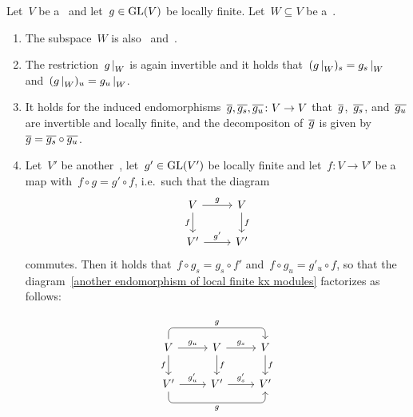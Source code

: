 \begin{lemma}
  \label{properties of local mjcd}
  Let~$V$ be a~ and let~$g \in \operatorname{GL}(V)$ be locally finite.
  Let~$W \subseteq V$ be a~.
  \begin{enumerate}
    \item
      The subspace~$W$ is also~ and~.
    \item
      \label{restriction of local mjcd}
      The restriction~$\restrict{g}{W}$ is again invertible and it holds that~$(\restrict{g}{W})_s = \restrict{g_s}{W}$ and~$(\restrict{g}{W})_u = \restrict{g_u}{W}$.
    \item
      \label{induced local mjcd}
      It holds for the induced endomorphisms~$\overline{g}, \overline{g_s}, \overline{g_u} \colon V \to V$ that~$\overline{g}$,~$\overline{g_s}$, and~$\overline{g_u}$ are invertible and locally finite, and the {\JCD} decompositon of~$\overline{g}$ is given by~$\overline{g} = \overline{g_s} \circ \overline{g_u}$.
    \item
      Let~$V'$ be another~, let~$g' \in \operatorname{GL}(V')$ be locally finite and let~$f \colon V \to V'$ be a~ map with~$f \circ g = g' \circ f$, i.e.\ such that the diagram
      \begin{equation}
        \label{another endomorphism of local finite kx modules}
        \begin{tikzcd}
            V
            \arrow{r}[above]{g}
            \arrow{d}[left]{f}
          & V
            \arrow{d}[right]{f}
          \\
            V'
            \arrow{r}[above]{g'}
          & V'
        \end{tikzcd}
      \end{equation}
      commutes.
      Then it holds that~$f \circ g_s = g_s \circ f'$ and~$f \circ g_u = g'_u \circ f$, so that the diagram~\eqref{another endomorphism of local finite kx modules} factorizes as follows:
      \[
        \begin{tikzcd}
            {}
          & {}
          & {}
          \\
            V
            \arrow[rounded corners,
              to path = { -- ([yshift=1em] \tikztostart.north)
                          -- ([yshift=1em] \tikztotarget.north) \tikztonodes
                          -- (\tikztotarget)
                        }
            ]{rr}[above]{g}
            \arrow{r}[above]{g_u}
            \arrow{d}[left]{f}
          & V
            \arrow{r}[above]{g_s}
            \arrow{d}[right]{f}
          & V
            \arrow{d}[right]{f}
          \\
            V'
            \arrow{r}[above]{g'_u}
            \arrow[rounded corners,
              to path = { -- ([yshift=-1em] \tikztostart.south)
                          -- ([yshift=-1em] \tikztotarget.south) \tikztonodes
                          -- (\tikztotarget)
                        }
            ]{rr}[below]{g}
          & V'
            \arrow{r}[above]{g'_s}
          & V'
        \end{tikzcd}
      \]
  \end{enumerate}
\end{lemma}


